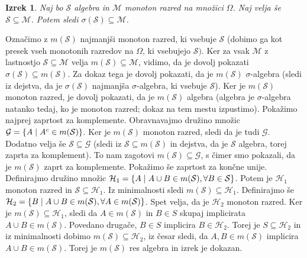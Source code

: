 \documentclass[12pt,a4paper]{amsart}
\theoremstyle{definition} %
\theoremstyle{plain} %
\newtheorem{izrek}[definicija]{Izrek}
\begin{document}
\begin{izrek} Naj bo $\mathcal{S}$ algebra in $\mathcal{M}$ monoton razred na množici $\Omega$. Naj velja še $\mathcal{S} \subseteq \mathcal{M}$. Potem sledi $\sigma{(\mathcal{S})} \subseteq \mathcal{M}$.
\end{izrek}
\proof
 Označimo z $m(\mathcal{S})$ najmanjši monoton razred, ki vsebuje $\mathcal{S}$ (dobimo ga kot presek vseh monotonih razredov na $\Omega$, ki vsebujejo $\mathcal{S}).$ Ker za vsak $\mathcal{M}$ z lastnostjo $\mathcal{S} \subseteq \mathcal{M}$ velja $m(\mathcal{S}) \subseteq \mathcal{M}$, vidimo, da je dovolj pokazati $\sigma(\mathcal{S}) \subseteq m(\mathcal{S})$. Za dokaz tega je dovolj pokazati, da je $m(\mathcal{S}) $ $\sigma$-algebra (sledi iz dejstva, da je $\sigma(\mathcal{S})$ najmanjša $\sigma$-algebra, ki vsebuje $\mathcal{S}$). Ker je $m(\mathcal{S})$ monoton razred, je dovolj pokazati, da je $m(\mathcal{S})$ algebra (algebra je $\sigma$-algebra natanko tedaj, ko je monoton razred; dokaz na tem mestu izpustimo). 
\newline
Pokažimo najprej zaprtost za komplemente. Obravnavajmo družino množic $\mathcal{G} = \{ A\hspace{0.1cm}|\hspace{0.1cm} A^c \in m(\mathcal{S})\}$.  Ker je $m(\mathcal{S})$ monoton razred, sledi da je tudi $\mathcal{G}$. Dodatno velja še $\mathcal{S} \subseteq \mathcal{G}$ (sledi iz $\mathcal{S} \subseteq m(\mathcal{S})$ in dejstva, da je $\mathcal{S}$ algebra, torej zaprta za komplement). To nam zagotovi $m(\mathcal{S}) \subseteq \mathcal{G}$, s čimer smo pokazali, da je $m(\mathcal{S})$ zaprt za komplemente.
\newline
Pokažimo še zaprtost za končne unije. Definirajmo družino množic $\mathcal{H}_1 = \{ A\hspace{0.1cm}|\hspace{0.1cm} A \cup B \in m(\mathcal{S}), \forall B \in \mathcal{S}\}$. Potem je $\mathcal{H}_1$ monoton razred in $\mathcal{S} \subseteq \mathcal{H}_1$. Iz minimalnosti sledi $m(\mathcal{S}) \subseteq \mathcal{H}_1$. Definirajmo še  $\mathcal{H}_2 = \{ B\hspace{0.1cm}|\hspace{0.1cm} A \cup B \in m(\mathcal{S}), \forall A \in m(\mathcal{S})\}$. Spet velja, da je $\mathcal{H}_2$ monoton razred. Ker je $m(\mathcal{S}) \subseteq \mathcal{H}_1$, sledi da $A \in m(\mathcal{S})$ in $B \in S$ skupaj implicirata $A \cup B \in m(\mathcal{S})$. Povedano drugače, $B \in S$ implicira $B \in \mathcal{H}_2$. Torej je $S \subseteq \mathcal{H}_2$  in iz minimalnosti dobimo $m(\mathcal{S}) \subseteq \mathcal{H}_2$, iz česar sledi, da $A,B \in m(\mathcal{S})$ implicira $A \cup B \in m(\mathcal{S})$. Torej je $m(\mathcal{S})$ res algebra in izrek je dokazan.
\end{document}
